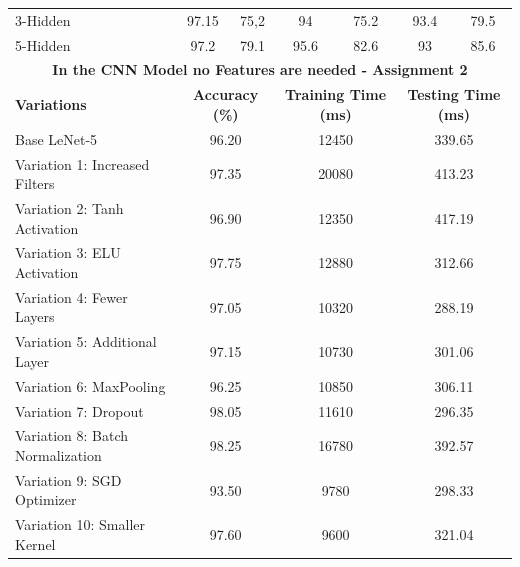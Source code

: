 \documentclass[a4paper,12pt]{article}
\begin{document}
\begin{table}[H]
{\begin{tabular}{l|cc|cc|cc}
        3-Hidden & 97.15 & 75,2 & 94 & 75.2 & 93.4 & 79.5 \\
        5-Hidden & 97.2 & 79.1 & 95.6 & 82.6 & 93 & 85.6 \\
        \midrule
        \multicolumn{7}{c}{\textbf{In the CNN Model no Features are needed - Assignment 2}} \\
        \midrule
        \textbf{Variations} & \multicolumn{2}{c}{\textbf{Accuracy (\%)}} & \multicolumn{2}{c}{\textbf{Training Time (ms)}} & \multicolumn{2}{c}{\textbf{Testing Time (ms)}} \\
        \cmidrule(lr){2-3} \cmidrule(lr){4-5} \cmidrule(lr){6-7}
        Base LeNet-5 & \multicolumn{2}{c}{96.20} & \multicolumn{2}{c}{12450} & \multicolumn{2}{c}{339.65} \\
        Variation 1: Increased Filters & \multicolumn{2}{c}{97.35} & \multicolumn{2}{c}{20080} & \multicolumn{2}{c}{413.23} \\
        Variation 2: Tanh Activation & \multicolumn{2}{c}{96.90} & \multicolumn{2}{c}{12350} & \multicolumn{2}{c}{417.19} \\
        Variation 3: ELU Activation & \multicolumn{2}{c}{97.75} & \multicolumn{2}{c}{12880} & \multicolumn{2}{c}{312.66} \\
        Variation 4: Fewer Layers & \multicolumn{2}{c}{97.05} & \multicolumn{2}{c}{10320} & \multicolumn{2}{c}{288.19} \\
        Variation 5: Additional Layer & \multicolumn{2}{c}{97.15} & \multicolumn{2}{c}{10730} & \multicolumn{2}{c}{301.06} \\
        Variation 6: MaxPooling & \multicolumn{2}{c}{96.25} & \multicolumn{2}{c}{10850} & \multicolumn{2}{c}{306.11} \\
        Variation 7: Dropout & \multicolumn{2}{c}{98.05} & \multicolumn{2}{c}{11610} & \multicolumn{2}{c}{296.35} \\
        Variation 8: Batch Normalization & \multicolumn{2}{c}{98.25} & \multicolumn{2}{c}{16780} & \multicolumn{2}{c}{392.57} \\
        Variation 9: SGD Optimizer & \multicolumn{2}{c}{93.50} & \multicolumn{2}{c}{9780} & \multicolumn{2}{c}{298.33} \\
        Variation 10: Smaller Kernel & \multicolumn{2}{c}{97.60} & \multicolumn{2}{c}{9600} & \multicolumn{2}{c}{321.04} \\
        \bottomrule
    \end{tabular}
    }
\end{table}
\end{document}

